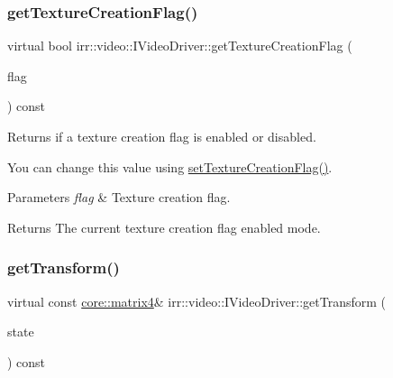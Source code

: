 \subsubsection{\texorpdfstring{get\+Texture\+Creation\+Flag()}{getTextureCreationFlag()}}
{\footnotesize\ttfamily virtual bool irr\+::video\+::\+I\+Video\+Driver\+::get\+Texture\+Creation\+Flag (\begin{DoxyParamCaption}\item[{\hyperlink{namespaceirr_1_1video_acaf6f7414534f7d62bff18c5bf11876f}{E\+\_\+\+T\+E\+X\+T\+U\+R\+E\+\_\+\+C\+R\+E\+A\+T\+I\+O\+N\+\_\+\+F\+L\+AG}}]{flag }\end{DoxyParamCaption}) const\hspace{0.3cm}{\ttfamily [pure virtual]}}



Returns if a texture creation flag is enabled or disabled. 

You can change this value using \hyperlink{classirr_1_1video_1_1IVideoDriver_a868b58a6b86b9e4841ca3879ce246c4e}{set\+Texture\+Creation\+Flag()}. 
\begin{DoxyParams}{Parameters}
{\em flag} & Texture creation flag. \\
\hline
\end{DoxyParams}
\begin{DoxyReturn}{Returns}
The current texture creation flag enabled mode. 
\end{DoxyReturn}
\mbox{\label{classirr_1_1video_1_1IVideoDriver_a85c7d04aee02c2d5d8102279f9233101}} 
\subsubsection{\texorpdfstring{get\+Transform()}{getTransform()}}
{\footnotesize\ttfamily virtual const \hyperlink{namespaceirr_1_1core_a73fa92e638c5ca97efd72da307cc9b65}{core\+::matrix4}\& irr\+::video\+::\+I\+Video\+Driver\+::get\+Transform (\begin{DoxyParamCaption}\item[{\hyperlink{namespaceirr_1_1video_a15b57657a320243be03ae6f66fcff43d}{E\+\_\+\+T\+R\+A\+N\+S\+F\+O\+R\+M\+A\+T\+I\+O\+N\+\_\+\+S\+T\+A\+TE}}]{state }\end{DoxyParamCaption}) const\hspace{0.3cm}{\ttfamily [pure virtual]}}



